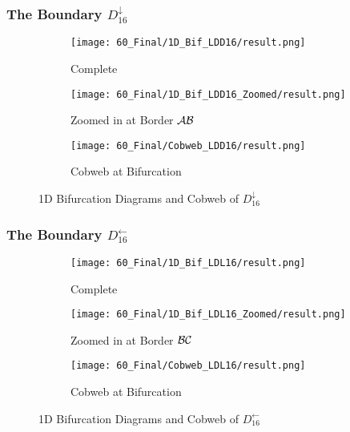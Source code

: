 \subsubsection{The Boundary $D_{16}^\downarrow$}

\begin{figure}
    \centering
    \begin{subfigure}{0.3\textwidth}
        \centering
        \texttt{[image: 60\_Final/1D\_Bif\_LDD16/result.png]}
        \caption{Complete}
        \label{fig:final.bifurcation.D.down}
    \end{subfigure}
    \begin{subfigure}{0.3\textwidth}
        \centering
        \texttt{[image: 60\_Final/1D\_Bif\_LDD16\_Zoomed/result.png]}
        \caption{Zoomed in at Border $\mathcal{A}\mathcal{B}$}
        \label{fig:final.bifurcation.D.down.zoomed}
    \end{subfigure}
    \begin{subfigure}{0.3\textwidth}
        \centering
        \texttt{[image: 60\_Final/Cobweb\_LDD16/result.png]}
        \caption{Cobweb at Bifurcation}
        \label{fig:final.bifurcation.D.down.cobweb}
    \end{subfigure}
    \caption{1D Bifurcation Diagrams and Cobweb of $D_{16}^\downarrow$}
\end{figure}

\subsubsection{The Boundary $D_{16}^\leftarrow$}

\begin{figure}
    \centering
    \begin{subfigure}{0.3\textwidth}
        \centering
        \texttt{[image: 60\_Final/1D\_Bif\_LDL16/result.png]}
        \caption{Complete}
        \label{fig:final.bifurcation.D.left}
    \end{subfigure}
    \begin{subfigure}{0.3\textwidth}
        \centering
        \texttt{[image: 60\_Final/1D\_Bif\_LDL16\_Zoomed/result.png]}
        \caption{Zoomed in at Border $\mathcal{B}\mathcal{C}$}
        \label{fig:final.bifurcation.D.left.zoomed}
    \end{subfigure}
    \begin{subfigure}{0.3\textwidth}
        \centering
        \texttt{[image: 60\_Final/Cobweb\_LDL16/result.png]}
        \caption{Cobweb at Bifurcation}
        \label{fig:final.bifurcation.D.left.cobweb}
    \end{subfigure}
    \caption{1D Bifurcation Diagrams and Cobweb of $D_{16}^\leftarrow$}
\end{figure}
